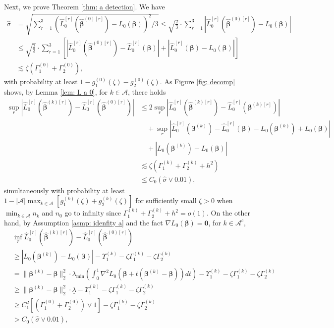 \documentclass[12pt]{article}
\newcommand{\twonorm}[1]{\|#1\|_{2}}
\newcommand{\norm}[1]{|#1|}
\newcommand{\bbeta}{\bm{\beta}}
\newcommand{\hbeta}{\hat{\bm{\beta}}}
\newcommand{\bbetak}[1]{\bm{\beta}^{(#1)}}
\newcommand{\ma}{\mathcal{A}}
\newcommand{\mac}{\mathcal{A}^c}
\newcommand{\<}{\langle}
\renewcommand{\>}{\rangle}
\begin{document}
Next, we prove Theorem \ref{thm: a detection}. We have
\begin{align}
	\hat{\sigma} &= \sqrt{\sum_{r=1}^3(\hat{L}_0^{[r]}(\hat{\bbeta}^{(0)[r]}) - L_0(\bbeta))^2/3} \leq \sqrt{\frac{2}{3}}\cdot \sum_{r=1}^3 \norm{\hat{L}_0^{[r]}(\hat{\bbeta}^{(0)[r]}) - L_0(\bbeta)}  \\
	&\leq \sqrt{\frac{2}{3}}\cdot\sum_{r=1}^3 \left[\norm{\hat{L}_0^{[r]}(\hat{\bbeta}^{(0)[r]}) - \hat{L}_0^{[r]}(\bbeta)} + \norm{\hat{L}_0^{[r]}(\bbeta) - L_0(\bbeta)}\right] \\
	&\lesssim \zeta\left(\Gamma_1^{(0)} + \Gamma_2^{(0)}\right),
\end{align}
with probability at least $1-g_1^{(0)}(\zeta) - g_2^{(0)}(\zeta)$.
As Figure \ref{fig: decomp} shows, by Lemma \ref{lem: L a 0}, for $k\in \ma$, there holds
\begin{align}
	\sup_r  \norm{\hat{L}_0^{[r]}(\hat{\bbeta}^{(k)[r]}) - \hat{L}_0^{[r]}(\hbeta^{(0)[r]})}&\leq 
	2\sup_r \norm{\hat{L}_0^{[r]}(\hat{\bbeta}^{(k)[r]}) - \hat{L}_0^{[r]}(\bbeta^{(k)[r]})} \\
	&\quad+ \sup_r \norm{\hat{L}_0^{[r]}(\bbeta^{(k)}) -\hat{L}_0^{[r]}(\bbeta)- L_0(\bbeta^{(k)})+L_0(\bbeta)} \\
	&\quad + \norm{L_0(\bbeta^{(k)}) - L_0(\bbeta)} \\
	&\lesssim \zeta\left(\Gamma_1^{(k)} + \Gamma_2^{(k)} + h^2\right) \\
	&\leq C_0(\hat{\sigma} \vee 0.01), \label{eq: l0 first eq}
\end{align}
simultaneously with probability at least $1-|\ma|\max_{k \in \ma}[g_1^{(k)}(\zeta) + g_2^{(k)}(\zeta)]$ for sufficiently small $\zeta > 0$ when $\min_{k \in \ma}n_k$ and $n_0$ go to infinity since $\Gamma_1^{(k)} + \Gamma_2^{(k)} + h^2 = o(1)$.
On the other hand, by Assumption \ref{asmp: idenfity a} and the fact $\nabla L_0(\bbeta) = \bm{0}$, for $k\in \mac$, 
\begin{align}
	&\inf_r\hat{L}_0^{[r]}(\hat{\bbeta}^{(k)[r]}) - \hat{L}_0^{[r]}(\hbeta^{(0)[r]}) \\
	&\geq \norm{L_0(\bbeta^{(k)}) - L_0(\bbeta)} - \Upsilon_1^{(k)} - \zeta\Gamma_1^{(k)} - \zeta\Gamma_2^{(k)} \\
	&=  \twonorm{\bbetak{k} - \bbeta}^2 \cdot\lambda_{\min}\left(\int_0^1\nabla^2 L_0(\bbeta + t(\bbetak{k}-\bbeta))dt\right) - \Upsilon_1^{(k)} - \zeta\Gamma_1^{(k)} - \zeta\Gamma_2^{(k)}  \\
	&\geq \twonorm{\bbetak{k} - \bbeta}^2 \cdot\underline{\lambda}  - \Upsilon_1^{(k)} - \zeta\Gamma_1^{(k)} - \zeta\Gamma_2^{(k)} \\
	&\geq C_1^2\left[(\Gamma_1^{(0)} + \Gamma_2^{(0)}) \vee 1\right] - \zeta\Gamma_1^{(k)} - \zeta\Gamma_2^{(k)} \\
	&> C_0(\hat{\sigma} \vee 0.01),
\end{align}
\end{document}
